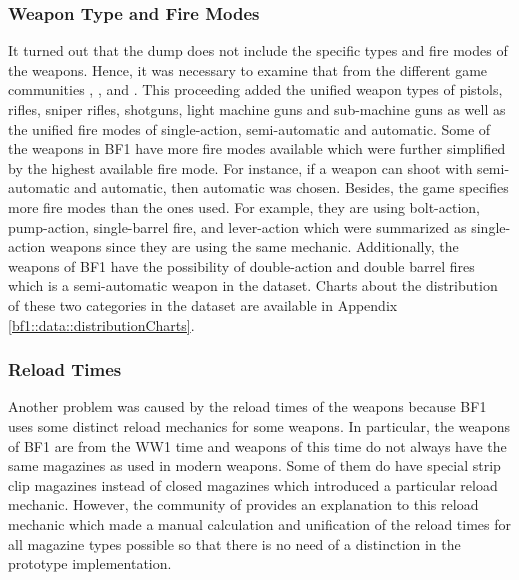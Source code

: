 \documentclass[MGS,Master,english]{twbook}%
\begin{document}
\subsubsection{Weapon Type and Fire Modes}
It turned out that the dump does not include the specific types and fire modes of the weapons. Hence, it was necessary to examine that from the different game communities \citep{symthic::bf1stats}, \citep{bf1::community1}, and \citep{bf1::community2}. This proceeding added the unified weapon types of pistols, rifles, sniper rifles, shotguns, light machine guns and sub-machine guns as well as the unified fire modes of single-action, semi-automatic and automatic. Some of the weapons in \ac{BF1} have more fire modes available which were further simplified by the highest available fire mode. For instance, if a weapon can shoot with semi-automatic and automatic, then automatic was chosen. Besides, the game specifies more fire modes than the ones used. For example, they are using bolt-action, pump-action, single-barrel fire, and lever-action which were summarized as single-action weapons since they are using the same mechanic. Additionally, the weapons of BF1 have the possibility of double-action and double barrel fires which is a semi-automatic weapon in the dataset. Charts about the distribution of these two categories in the dataset are available in Appendix \ref{bf1::data::distributionCharts}. 

\subsubsection{Reload Times}
Another problem was caused by the reload times of the weapons because \ac{BF1} uses some distinct reload mechanics for some weapons. In particular, the weapons of BF1 are from the WW1 time and weapons of this time do not always have the same magazines as used in modern weapons. Some of them do have special strip clip magazines instead of closed magazines which introduced  a particular reload mechanic. However, the community of \citep{symthic::bf1stats} provides an explanation to this reload mechanic which made a manual calculation and unification of the reload times for all magazine types possible so that there is no need of a distinction in the prototype implementation.
\end{document}
